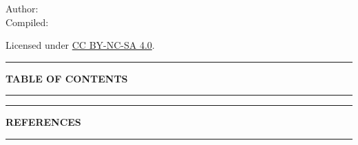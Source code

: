 \documentclass[12pt, a4paper, openright]{report}
\begin{document}
\vfill

\begin{center}
  {\small\color{white!50}Author: \textit{\NoteAuthor}}\\[0.3em]
  {\small\color{white!50}Compiled: \textit{\CompileDate}}

  {
    \vspace*{1em}
    \small \color{white!50}
    Licensed under \href{https://creativecommons.org/licenses/by-nc-sa/4.0/}{CC BY-NC-SA 4.0}.\\
    \vspace{0.5em}
  }
\end{center}

\clearpage
\pagestyle{fancy}

\begin{center}
  {\color{StarGold}\rule{0.4\textwidth}{0.5pt}}
\end{center}
\vspace{0.8cm}
{\centering\Large\bfseries\color{DeepSpace}TABLE OF CONTENTS\par}
\vspace{0.8cm}
\begin{center}
  {\color{StarGold}\rule{0.4\textwidth}{0.5pt}}
\end{center}
\vspace{1.2cm}
{%
  \hypersetup{linkcolor=DeepSpace}%
  \makeatletter{}\makeatother
}
\clearpage






\appendix


\clearpage

\begin{center}
  {\color{StarGold}\rule{0.4\textwidth}{0.5pt}}
\end{center}
\vspace{0.8cm}
{\centering\Large\bfseries\color{DeepSpace}REFERENCES\par}
\vspace{0.8cm}
\begin{center}
  {\color{StarGold}\rule{0.4\textwidth}{0.5pt}}
\end{center}
\vspace{1.2cm}

\nocite{*}
\label{bibliography}
\printbibliography[heading=none]

\end{document}

